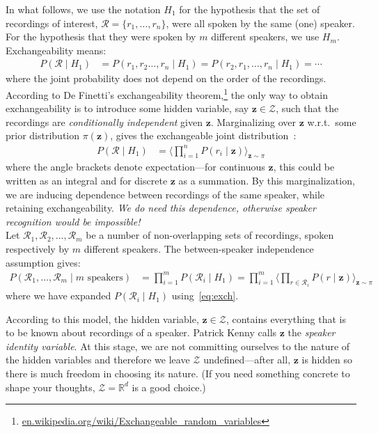 \documentclass[a4paper,oneside,12pt,english]{report}
\def\zvec{\mathbf{z}}
\def\expv#1#2{\bigl\langle#1\bigr\rangle_{#2}}
\def\R{\mathbb{R}}
\def\Zset{\mathcal{Z}}
\def\Rset{\mathcal{R}}
\def\Zset{\mathcal{Z}}
\begin{document}
\noindent In what follows, we use the notation $H_1$ for the hypothesis that the set of recordings of interest, $\Rset=\{r_1,\ldots,r_n\}$, were all spoken by the same (one) speaker. For the hypothesis that they were spoken by $m$ different speakers, we use $H_m$. Exchangeability means:
\begin{align*}
P(\Rset\mid H_1) &= P(r_1,r_2\ldots,r_n\mid H_1) = P(r_2,r_1,\ldots,r_n\mid H_1) = \cdots
\end{align*}
where the joint probability does not depend on the order of the recordings. According to De Finetti's exchangeability theorem,\footnote{\url{en.wikipedia.org/wiki/Exchangeable_random_variables}} the only way to obtain exchangeability is to introduce some hidden variable, say $\zvec\in\Zset$, such that the recordings are \emph{conditionally independent} given $\zvec$. Marginalizing over $\zvec$ w.r.t.\ some prior distribution $\pi(\zvec)$, gives the exchangeable joint distribution~\cite{Chow}:  
\begin{align}
\label{eq:exch}
P(\Rset\mid H_1) &= \expv{\prod_{i=1}^n P(r_i\mid \zvec)}{\zvec\sim\pi}
\end{align}
where the angle brackets denote expectation---for continuous $\zvec$, this could be written as an integral and for discrete $\zvec$ as a summation. By this marginalization, we are inducing dependence between recordings of the same speaker, while retaining exchangeability. \emph{We do need this dependence, otherwise speaker recognition would be impossible!}\\

\noindent Let $\Rset_1,\Rset_2,\ldots,\Rset_m$ be a number of non-overlapping sets of recordings, spoken respectively by $m$ different speakers. The between-speaker independence assumption gives:
\begin{align}
\label{eq:iid}
P(\Rset_1,\ldots,\Rset_m\mid\text{$m$ speakers}) &= \prod_{i=1}^m P(\Rset_i\mid H_1) = \prod_{i=1}^m \expv{\prod_{r\in\Rset_i} P(r\mid\zvec)}{\zvec\sim\pi}   
\end{align}
where we have expanded $P(\Rset_i\mid H_1)$ using~\eqref{eq:exch}.

According to this model, the hidden variable, $\zvec\in\Zset$, contains everything that is to be known about recordings of a speaker. Patrick Kenny calls $\zvec$ the \emph{speaker identity variable}. At this stage, we are not committing ourselves to the nature of the hidden variables and therefore we leave $\Zset$ undefined---after all, $\zvec$ is hidden so there is much freedom in choosing its nature. (If you need something concrete to shape your thoughts, $\Zset=\R^d$ is a good choice.) 
\end{document}
